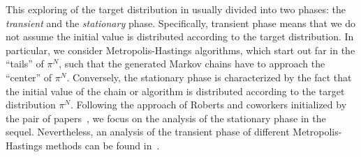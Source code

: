 This exploring of the target distribution in usually divided into two phases: the \textit{transient} and the \textit{stationary} phase. Specifically, transient phase means that we do not assume the initial value is distributed according to the target distribution. In particular, we consider Metropolis-Hastings algorithms, which start out far in the ``tails'' of $ \pi^{N} $, such that the generated Markov chains have to approach the ``center'' of $ \pi^{N} $. Conversely, the stationary phase is characterized by the fact that the initial value of the chain or algorithm is distributed according to the target distribution $ \pi^{N} $. Following the approach of Roberts and coworkers initialized by the pair of papers~\autocite{Roberts1997, Roberts2001}, we focus on the analysis of the stationary phase in the sequel. Nevertheless, an analysis of the transient phase of different Metropolis-Hastings methods can be found in~\autocite{Christensen2003, Jourdain2013}.




